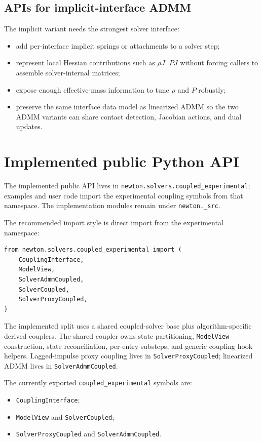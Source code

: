 \documentclass[11pt]{article}
\begin{document}
\subsection{APIs for implicit-interface ADMM}

The implicit variant needs the strongest solver interface:
\begin{itemize}
\item add per-interface implicit springs or attachments to a solver step;
\item represent local Hessian contributions such as $\rho J^\top P J$ without forcing
      callers to assemble solver-internal matrices;
\item expose enough effective-mass information to tune $\rho$ and $P$ robustly;
\item preserve the same interface data model as linearized ADMM so the two ADMM
      variants can share contact detection, Jacobian actions, and dual updates.
\end{itemize}

\section{Implemented public Python API}

The implemented public API lives in
\texttt{newton.solvers.coupled\_experimental}; examples and user code import
the experimental coupling symbols from that namespace. The implementation
modules remain under \texttt{newton.\_src}.

The recommended import style is direct import from the experimental namespace:
\begin{verbatim}
from newton.solvers.coupled_experimental import (
    CouplingInterface,
    ModelView,
    SolverAdmmCoupled,
    SolverCoupled,
    SolverProxyCoupled,
)
\end{verbatim}

The implemented split uses a shared coupled-solver base plus algorithm-specific
derived couplers. The shared coupler owns state partitioning, \texttt{ModelView}
construction, state reconciliation, per-entry substeps, and generic coupling hook
helpers. Lagged-impulse proxy coupling lives in \texttt{SolverProxyCoupled};
linearized ADMM lives in \texttt{SolverAdmmCoupled}.

The currently exported \texttt{coupled\_experimental} symbols are:
\begin{itemize}
\item \texttt{CouplingInterface};
\item \texttt{ModelView} and \texttt{SolverCoupled};
\item \texttt{SolverProxyCoupled} and \texttt{SolverAdmmCoupled}.
\end{itemize}
\end{document}
